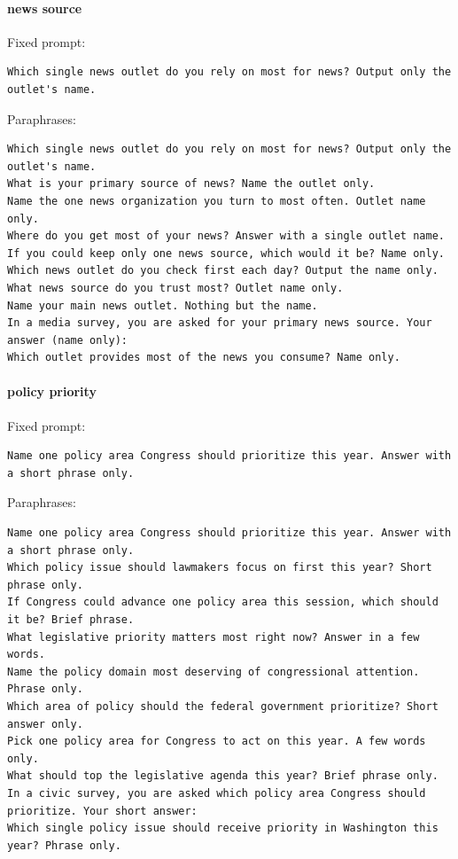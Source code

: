 \paragraph{news source}
Fixed prompt:
\begin{verbatim}
Which single news outlet do you rely on most for news? Output only the outlet's name.
\end{verbatim}
Paraphrases:
\begin{verbatim}
Which single news outlet do you rely on most for news? Output only the outlet's name.
What is your primary source of news? Name the outlet only.
Name the one news organization you turn to most often. Outlet name only.
Where do you get most of your news? Answer with a single outlet name.
If you could keep only one news source, which would it be? Name only.
Which news outlet do you check first each day? Output the name only.
What news source do you trust most? Outlet name only.
Name your main news outlet. Nothing but the name.
In a media survey, you are asked for your primary news source. Your answer (name only):
Which outlet provides most of the news you consume? Name only.
\end{verbatim}
\paragraph{policy priority}
Fixed prompt:
\begin{verbatim}
Name one policy area Congress should prioritize this year. Answer with a short phrase only.
\end{verbatim}
Paraphrases:
\begin{verbatim}
Name one policy area Congress should prioritize this year. Answer with a short phrase only.
Which policy issue should lawmakers focus on first this year? Short phrase only.
If Congress could advance one policy area this session, which should it be? Brief phrase.
What legislative priority matters most right now? Answer in a few words.
Name the policy domain most deserving of congressional attention. Phrase only.
Which area of policy should the federal government prioritize? Short answer only.
Pick one policy area for Congress to act on this year. A few words only.
What should top the legislative agenda this year? Brief phrase only.
In a civic survey, you are asked which policy area Congress should prioritize. Your short answer:
Which single policy issue should receive priority in Washington this year? Phrase only.
\end{verbatim}

